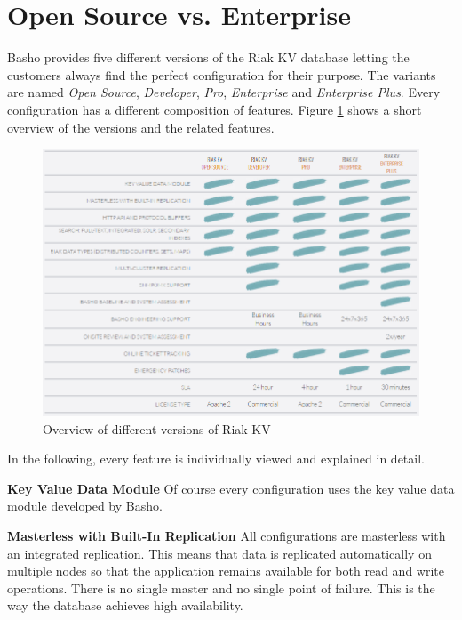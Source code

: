 \section{Open Source vs. Enterprise}

Basho provides five different versions of the Riak KV database letting the customers always find the perfect configuration for their purpose. The variants are named \textit{Open Source}, \textit{Developer}, \textit{Pro}, \textit{Enterprise} and \textit{Enterprise Plus}. Every configuration has a different composition of features. Figure \ref{fig:overview} shows a short overview of the versions and the related features.

\begin{figure}[ht]
	\centering
	\includegraphics[width=\textwidth]{images/opensource_vs_commercial.png}
	\caption[Overview of different versions of Riak KV \protect\cite{Basho.01.04.2017}]{Overview of different versions of Riak KV \protect\cite{Basho.01.04.2017}}
	\label{fig:overview}
\end{figure}

In the following, every feature is individually viewed and explained in detail.

\newpage

\textbf{Key Value Data Module}\newline
Of course every configuration uses the key value data module developed by Basho.

\textbf{Masterless with Built-In Replication}\newline
All configurations are masterless with an integrated replication. This means that data is replicated automatically on multiple nodes so that the application remains available for both read and write operations. There is no single master and no single point of failure. This is the way the database achieves high availability. \cite{Basho.01.04.2017}

